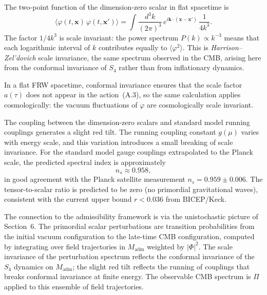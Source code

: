 \documentclass[12pt,a4paper]{article}
\theoremstyle{remark}
\begin{document}
The two-point function of the dimension-zero scalar in flat spacetime is
\begin{equation}
  \langle\varphi(t,\mathbf{x})\,\varphi(t,\mathbf{x}')\rangle
  = \int\!\frac{d^3k}{(2\pi)^3}\,e^{i\mathbf{k}\cdot(\mathbf{x}-\mathbf{x}')}\,\frac{1}{4k^3}.
\end{equation}
The factor $1/4k^3$ is scale invariant: the power spectrum $P(k) \propto k^{-3}$ means that
each logarithmic interval of $k$ contributes equally to $\langle\varphi^2\rangle$. This is
\emph{Harrison--Zel'dovich} scale invariance, the same spectrum observed in the CMB, arising
here from the conformal invariance of $S_4$ rather than from inflationary dynamics.

In a flat FRW spacetime, conformal invariance ensures that the scale factor $a(\tau)$ does not
appear in the action~(A.3), so the same calculation applies cosmologically: the vacuum
fluctuations of $\varphi$ are cosmologically scale invariant.

The coupling between the dimension-zero scalars and standard model running couplings generates
a slight red tilt. The running coupling constant $g(\mu)$ varies with energy scale, and
this variation introduces a small breaking of scale invariance. For the standard model gauge
couplings extrapolated to the Planck scale, the predicted spectral index is approximately
\begin{equation}
  n_s \approx 0.958,
\end{equation}
in good agreement with the Planck satellite measurement $n_s = 0.959 \pm 0.006$. The tensor-to-scalar
ratio is predicted to be zero (no primordial gravitational waves), consistent with the current
upper bound $r < 0.036$ from BICEP/Keck.

The connection to the admissibility framework is via the unistochastic picture of Section~6.
The primordial scalar perturbations are transition probabilities from the initial vacuum
configuration to the late-time CMB configuration, computed by integrating over field trajectories
in $M_{\mathrm{adm}}$ weighted by $|\Phi|^2$. The scale invariance of the perturbation
spectrum reflects the conformal invariance of the $S_4$ dynamics on $M_{\mathrm{adm}}$;
the slight red tilt reflects the running of couplings that breaks conformal invariance at
finite energy. The observable CMB spectrum is $\Pi$ applied to this ensemble of field
trajectories.



\end{document}
